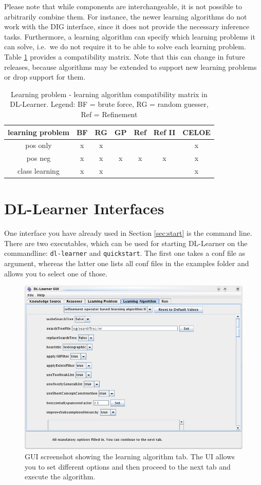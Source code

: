 \documentclass[a4paper,12pt]{scrartcl}
\begin{document}
Please note that while components are interchangeable, it is not possible to arbitrarily combine them. For instance, the newer learning algorithms do not work with the DIG interface, since it does not provide the necessary inference tasks. Furthermore, a learning algorithm can specify which learning problems it can solve, i.e.~we do not require it to be able to solve each learning problem. Table \ref{tab:la_lp_comp} provides a compatibility matrix. Note that this can change in future releases, because algorithms may be extended to support new learning problems or drop support for them.

\begin{table}[htb]
\centering
\begin{tabular}{c|cccccc}
learning problem & BF & RG & GP & Ref & Ref II & CELOE \\\hline
pos only & x & x & & & & x \\
pos neg & x & x & x & x & x & x \\
class learning & x & x & & & & x
\end{tabular}
\caption{Learning problem - learning algorithm compatibility matrix in DL-Learner. Legend: BF = brute force, RG = random guesser, Ref = Refinement}
\label{tab:la_lp_comp}
\end{table}

\section{DL-Learner Interfaces}

One interface you have already used in Section \ref{sec:start} is the command line. There are two executables, which can be used for starting DL-Learner on the commandline: \verb|dl-learner| and \verb|quickstart|. The first one takes a conf file as argument, whereas the latter one lists all conf files in the examples folder and allows you to select one of those.

\begin{figure}
 \centering
 \includegraphics[width=.8\textwidth]{../../resources/screenshots/gui_algorithm}
 \caption{GUI screenshot showing the learning algorithm tab. The UI allows you to set different options and then proceed to the next tab and execute the algorithm.}
 \label{fig:gui}
\end{figure}
\end{document}
